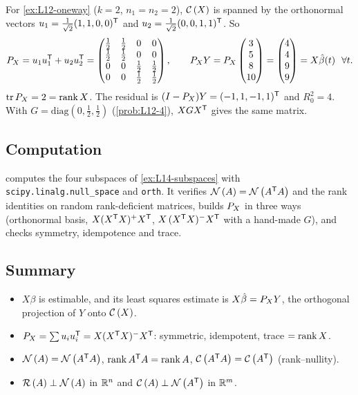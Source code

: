 \begin{example}\label{ex:L14-PXoneway}
For \cref{ex:L12-oneway} ($k=2$, $n_1=n_2=2$), $\mathcal{C}\left(X\right)$ is spanned by the orthonormal vectors
$u_1=\frac1{\sqrt2}(1,1,0,0)^{\mathsf T}$ and $u_2=\frac1{\sqrt2}(0,0,1,1)^{\mathsf T}$. So
\[
\PX=u_1u_1\T+u_2u_2\T=\begin{pmatrix}\tfrac12&\tfrac12&0&0\\\tfrac12&\tfrac12&0&0\\0&0&\tfrac12&\tfrac12\\0&0&\tfrac12&\tfrac12\end{pmatrix},
\qquad \PX Y=\PX\begin{pmatrix}3\\5\\8\\10\end{pmatrix}=\begin{pmatrix}4\\4\\9\\9\end{pmatrix}=X\hat\beta(t)\ \ \forall t .
\]
$\operatorname{tr}P_X=2=\operatorname{rank} X$. The residual is $(I-P_X)Y=(-1,1,-1,1)^{\mathsf T}$ and $R_0^2=4$. With $G=\mathrm{diag}(0,\tfrac12,\tfrac12)$
(\cref{prob:L12-4}), $XGX^{\mathsf T}$ gives the same matrix.
\end{example}

\subsection{Computation}
 computes the four subspaces of \cref{ex:L14-subspaces} with
\texttt{scipy.linalg.null\_space} and \texttt{orth}. It verifies $\mathcal{N}\left(A\right)=\mathcal{N}\left(A^{\mathsf T} A\right)$ and the rank identities on random
rank-deficient matrices, builds $P_X$ in three ways (orthonormal basis, $X(X^{\mathsf T} X)^{+}X^{\mathsf T}$, $X\,(X^{\mathsf T} X)^{-}X^{\mathsf T}$ with a
hand-made $G$), and checks symmetry, idempotence and trace.

\subsection{Summary}
\begin{itemize}
  \item $X\beta$ is estimable, and its least squares estimate is $X\hat\beta=P_X Y$, the orthogonal projection of $Y$ onto $\mathcal{C}\left(X\right)$.
  \item $P_X=\sum u_iu_i^{\mathsf T}=X(X^{\mathsf T} X)^{-}X^{\mathsf T}$: symmetric, idempotent, trace $=\operatorname{rank} X$.
  \item $\mathcal{N}\left(A\right)=\mathcal{N}\left(A^{\mathsf T} A\right)$, $\operatorname{rank} A^{\mathsf T} A=\operatorname{rank} A$, $\mathcal{C}\left(A^{\mathsf T} A\right)=\mathcal{C}\left(A^{\mathsf T}\right)$ (rank--nullity).
  \item $\mathcal{R}\left(A\right)\perp\mathcal{N}\left(A\right)$ in $\mathbb R^n$ and $\mathcal{C}\left(A\right)\perp\mathcal{N}\left(A^{\mathsf T}\right)$ in $\mathbb R^m$.
\end{itemize}

